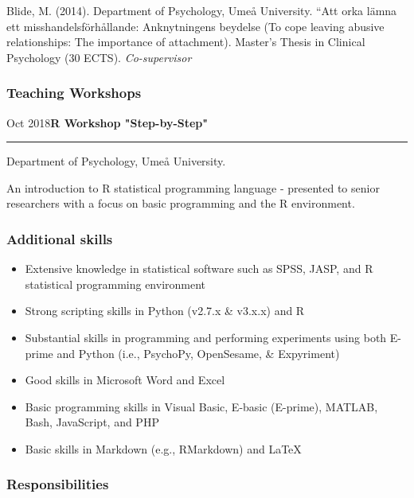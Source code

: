 \documentclass[]{article}
\providecommand{\tightlist}{%
  \setlength{\itemsep}{0pt}\setlength{\parskip}{0pt}}
\begin{document}
Blide, M. (2014). Department of Psychology, Umeå University. ``Att orka
lämna ett misshandelsförhållande: Anknytningens beydelse (To cope
leaving abusive relationships: The importance of attachment). Master's
Thesis in Clinical Psychology (30 ECTS). \emph{Co-supervisor}

\hypertarget{teaching-workshops}{%
\subsubsection{Teaching Workshops}\label{teaching-workshops}}

Oct 2018\hspace{0.75cm}\textbf{R Workshop "Step-by-Step"}\vspace{1mm}

\hrule
\begin{changemargin}{2.15cm}{2.4cm}


Department of Psychology, Umeå University.

An introduction to R statistical programming language - presented to senior researchers with a focus on basic programming and the R environment.

\end{changemargin}

\hypertarget{additional-skills}{%
\subsubsection{Additional skills}\label{additional-skills}}

\begin{itemize}
\tightlist
\item
  Extensive knowledge in statistical software such as SPSS, JASP, and R
  statistical programming environment
\item
  Strong scripting skills in Python (v2.7.x \& v3.x.x) and R
\item
  Substantial skills in programming and performing experiments using
  both E-prime and Python (i.e., PsychoPy, OpenSesame, \& Expyriment)
\item
  Good skills in Microsoft Word and Excel
\item
  Basic programming skills in Visual Basic, E-basic (E-prime), MATLAB,
  Bash, JavaScript, and PHP
\item
  Basic skills in Markdown (e.g., RMarkdown) and \LaTeX
\end{itemize}

\hypertarget{responsibilities}{%
\subsubsection{Responsibilities}\label{responsibilities}}
\end{document}
